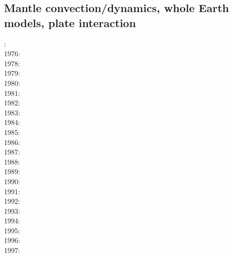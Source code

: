 \subsection*{Mantle convection/dynamics, whole Earth models, plate interaction}

: \cite{hemw75}\\
1976: \cite{mcri76}\\
1978: \cite{mahz78}\cite{hsui78}\\
1979: \cite{ludt79}\cite{buss79}\\
1980: \cite{olco80}\cite{jamc80}\cite{scsc80}\\
1981: \cite{buss81}\cite{jasc81}\\
1982: \cite{jape82}\cite{homc82}\\
1983: \cite{hous83}\cite{hous83b}\cite{chri83}\cite{mcke83}\\
1984: \cite{olyb84}\cite{jarv84}\cite{haeb84}\cite{harp84}\cite{davi84}\cite{boas84}\cite{chri84}
      \cite{moca84}\cite{flyu84}\\
1985: \cite{jarv85}\cite{baum85}\cite{chri85}\cite{csra85}\\
1986: \cite{davi86}\cite{guda86}\cite{quys86}\\
1987: \cite{yuqh87}\\
1988: \cite{haeb88}\\
1989: \cite{besg89}\cite{schm89}\\
1990: \cite{trab90}\cite{gurn90}\cite{ketu90}\\
1991: \cite{chha91}\cite{mawe91}\cite{gaot91}\\
1992: \cite{besg92}\cite{mayw92}\cite{vayv92}\\
1993: \cite{zhch93}\cite{jarv93}\cite{tack93}\cite{bucc93}\cite{carm93}\cite{vavy93}\cite{tasg93}
      \cite{zhgu93}\cite{mamc93}\cite{zebi93}\\
1994: \cite{haeb94}\cite{chho94}\cite{tasg94}\cite{itki94}\cite{leka94}\\
1995: \cite{zhgu95}\cite{vayv95}\cite{buba95}\cite{rasz95}\cite{berc95}\cite{puhj95}\cite{pujh95}
      \cite{solo95}\\
1996: \cite{zhyu96}\cite{hond96}\cite{rytr96a}\cite{rytr96b}\cite{tack96}\cite{trbo96}
      \cite{birg96}\cite{burb96}\cite{kafo96}\cite{guez96}\cite{vayu96}\cite{rasz96}\cite{rasz96b}
      \cite{leka96}\\
1997: \cite{hond97}\cite{iwho97}\cite{burb97}\cite{mole97}\cite{somo97}\cite{rats97}\\
